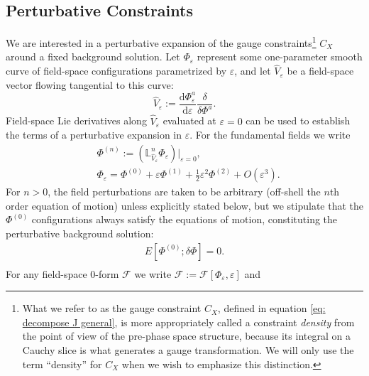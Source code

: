 \documentclass[]{jkpaper}
\theoremstyle{plain}
\theoremstyle{definition}
\newcommand{\eps}{\varepsilon}
\def\extd{\mathrm {d}}
\newcommand{\fL}{\mathbb{L}}
\begin{document}
\subsection{Perturbative Constraints}
\label{subsec: perturbative constraints}
We are interested in a perturbative expansion of the gauge constraints\footnote{What we refer to as the gauge constraint $C_X$, defined in equation \eqref{eq: decompose J general}, is more appropriately called a constraint \textit{density} from the point of view of the pre-phase space structure, because its integral on a Cauchy slice is what generates a gauge transformation.  We will only use the term ``density'' for $C_X$ when we wish to emphasize this distinction.} $C_X$ around a fixed background solution.  Let $\Phi_\varepsilon$ represent some one-parameter smooth curve of field-space configurations parametrized by $\varepsilon$, and let $\hat{V}_\varepsilon$ be a field-space vector flowing tangential to this curve:
\begin{equation}\label{eq: define V}
\hat{V}_\varepsilon:=\frac{\extd \Phi^{a}_\varepsilon}{\extd \varepsilon}\frac{\delta}{\delta \Phi^a}.
\end{equation}
Field-space Lie derivatives along $\hat{V}_\varepsilon$ evaluated at $\varepsilon=0$ can be used to establish the terms of a perturbative expansion in $\varepsilon$. 
For the fundamental fields we write 
\begin{equation}\label{eq:fundamentalFieldExpansion}
\begin{split}
    &\Phi^{(n)}:=\left(\fL^{n}_{\hat{V}_\varepsilon}\Phi_\varepsilon\right)\big|_{\varepsilon=0},\\
    &\Phi_\varepsilon = \Phi^{(0)}+\varepsilon \Phi^{(1)}+\frac{1}{2} \eps^2\Phi^{(2)}+O(\varepsilon^3).
\end{split}\end{equation}
For $n>0$, the field perturbations are taken to be arbitrary (off-shell the $n$th order equation of motion) unless explicitly stated below, but we stipulate that the $\Phi^{(0)}$ configurations always satisfy the equations of motion, constituting the perturbative background solution:
\begin{equation}\begin{split}\label{eq: background EOM}
    E[\Phi^{(0)};\delta\Phi]=0.\\
\end{split}\end{equation}
For any field-space $0$-form $\mathcal{F}$ we write $\mathcal{F}:=\mathcal{F}[\Phi_\varepsilon,\varepsilon]$ and
\end{document}
